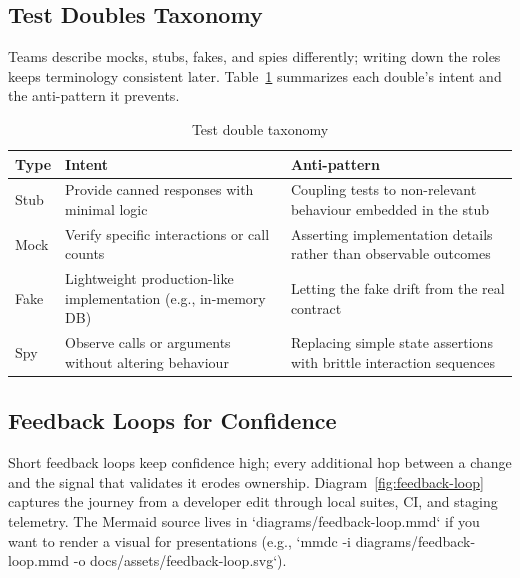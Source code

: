 \subsection{Test Doubles Taxonomy}

Teams describe mocks, stubs, fakes, and spies differently; writing down the roles keeps terminology consistent later. Table~\ref{tab:test-doubles} summarizes each double’s intent and the anti-pattern it prevents.

\begin{table}[h]
\centering
\caption{Test double taxonomy}
\label{tab:test-doubles}
\begin{tabular}{p{3cm}p{4cm}p{5cm}}
\toprule
Type & Intent & Anti-pattern \\
\midrule
Stub & Provide canned responses with minimal logic & Coupling tests to non-relevant behaviour embedded in the stub \\
Mock & Verify specific interactions or call counts & Asserting implementation details rather than observable outcomes \\
Fake & Lightweight production-like implementation (e.g., in-memory DB) & Letting the fake drift from the real contract \\
Spy & Observe calls or arguments without altering behaviour & Replacing simple state assertions with brittle interaction sequences \\
\bottomrule
\end{tabular}
\end{table}

\subsection{Feedback Loops for Confidence}

Short feedback loops keep confidence high; every additional hop between a change and the signal that validates it erodes ownership. Diagram~\ref{fig:feedback-loop} captures the journey from a developer edit through local suites, CI, and staging telemetry. The Mermaid source lives in `diagrams/feedback-loop.mmd` if you want to render a visual for presentations (e.g., `mmdc -i diagrams/feedback-loop.mmd -o docs/assets/feedback-loop.svg`).



